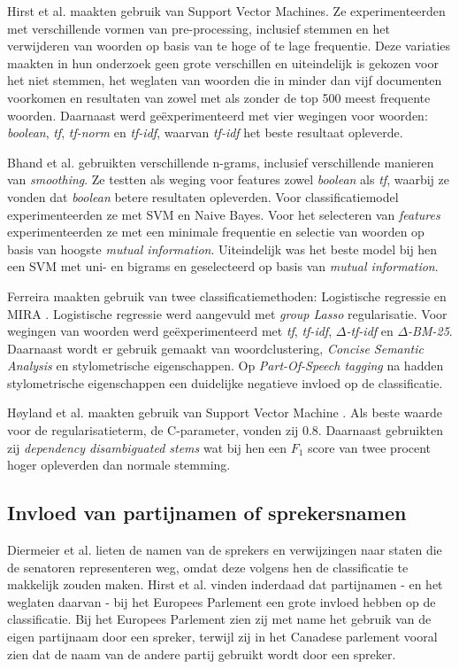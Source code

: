 Hirst et al. \cite{Hirst_textto} maakten  gebruik van Support Vector Machines. Ze experimenteerden met verschillende vormen van pre-processing, inclusief stemmen en het verwijderen van woorden op basis van te hoge of te lage frequentie. Deze variaties maakten in hun onderzoek geen grote verschillen en uiteindelijk is gekozen voor het niet stemmen, het weglaten van woorden die in minder dan vijf documenten voorkomen en resultaten van zowel met als zonder de top 500 meest frequente woorden. Daarnaast werd geëxperimenteerd met vier wegingen voor woorden: \textit{boolean}, \textit{tf}, \textit{tf-norm} en \textit{tf-idf}, waarvan \textit{tf-idf} het beste resultaat opleverde. \par

Bhand et al. \cite{bhand} gebruikten verschillende n-grams, inclusief verschillende manieren van \textit{smoothing}. Ze testten als weging voor features zowel \textit{boolean} als \textit{tf}, waarbij ze vonden dat \textit{boolean} betere resultaten opleverden. Voor classificatiemodel experimenteerden ze met SVM en Naive Bayes. Voor het selecteren van \textit{features} experimenteerden ze met een minimale frequentie en selectie van woorden op basis van hoogste \textit{mutual information}. Uiteindelijk was het beste model bij hen een SVM met uni- en bigrams en geselecteerd op basis van \textit{mutual information}.\par
Ferreira maakten gebruik van twee classificatiemethoden: Logistische regressie en MIRA \cite{Ferreira2016UsingTT}. Logistische regressie werd aangevuld met \textit{group Lasso} regularisatie. Voor wegingen van woorden werd geëxperimenteerd met \textit{tf}, \textit{tf-idf}, \textit{$\Delta$-tf-idf} en \textit{$\Delta$-BM-25}. Daarnaast wordt er gebruik gemaakt van woordclustering, \textit{Concise Semantic Analysis} en stylometrische eigenschappen. Op \textit{Part-Of-Speech tagging} na hadden stylometrische eigenschappen een duidelijke negatieve invloed op de classificatie.\par
Høyland et al. maakten gebruik van Support Vector Machine \cite{W14-2516}. Als beste waarde voor de regularisatieterm, de C-parameter, vonden zij 0.8. Daarnaast gebruikten zij \textit{dependency disambiguated
stems} wat bij hen een $F_1$ score van twee procent hoger opleverden dan normale stemming.\par

\subsection{Invloed van partijnamen of sprekersnamen}
Diermeier et al. \cite{diermeier_godbout_yu_kaufmann_2012} lieten de namen van de sprekers en verwijzingen naar staten die de senatoren representeren weg, omdat deze volgens hen de classificatie te makkelijk zouden maken. Hirst et al. \cite{Hirst_textto} vinden inderdaad dat partijnamen - en het weglaten daarvan - bij het Europees Parlement een grote invloed hebben op de classificatie. Bij het Europees Parlement zien zij met name het gebruik van de eigen partijnaam door een spreker, terwijl zij in het Canadese parlement vooral zien dat de naam van de andere partij gebruikt wordt door een spreker.

